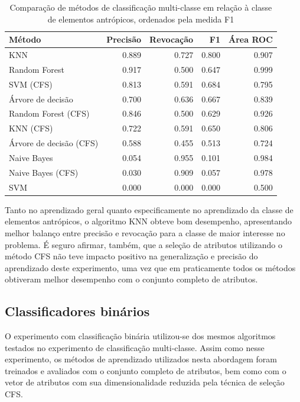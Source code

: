 \begin{table}[h]
\centering
\begin{tabulary}{\linewidth}{|L|R|R|R|R|}
\hline
\textbf{Método} & \textbf{Precisão} & \textbf{Revocação} & \textbf{F1} & \textbf{Área ROC} \\ \hline
KNN                     & 0.889 & 0.727 & 0.800 & 0.907 \\ \hline
Random Forest           & 0.917 & 0.500 & 0.647 & 0.999 \\ \hline
SVM (CFS)               & 0.813 & 0.591 & 0.684 & 0.795 \\ \hline
Árvore de decisão       & 0.700 & 0.636 & 0.667 & 0.839 \\ \hline
Random Forest (CFS)     & 0.846 & 0.500 & 0.629 & 0.926 \\ \hline
KNN (CFS)               & 0.722 & 0.591 & 0.650 & 0.806 \\ \hline
Árvore de decisão (CFS) & 0.588 & 0.455 & 0.513 & 0.724 \\ \hline
Naive Bayes             & 0.054 & 0.955 & 0.101 & 0.984 \\ \hline
Naive Bayes (CFS)       & 0.030 & 0.909 & 0.057 & 0.978 \\ \hline
SVM                     & 0.000 & 0.000 & 0.000 & 0.500 \\ \hline
\end{tabulary}
\caption{Comparação de métodos de classificação multi-classe em relação à classe de elementos antrópicos, ordenados pela medida F1}
\label{tab:experimentoClassificacaoRevocacao}
\end{table}

Tanto no aprendizado geral quanto especificamente no aprendizado da classe de elementos antrópicos, o algoritmo KNN obteve bom desempenho, apresentando melhor balanço entre precisão e revocação para a classe de maior interesse no problema. É seguro afirmar, também, que a seleção de atributos utilizando o método CFS não teve impacto positivo na generalização e precisão do aprendizado deste experimento, uma vez que em praticamente todos os métodos obtiveram melhor desempenho com o conjunto completo de atributos.

\subsection{Classificadores binários}

O experimento com classificação binária utilizou-se dos mesmos algoritmos testados no experimento de classificação multi-classe. Assim como nesse experimento, os métodos de aprendizado utilizados nesta abordagem foram treinados e avaliados com o conjunto completo de atributos, bem como com o vetor de atributos com sua dimensionalidade reduzida pela técnica de seleção CFS.

